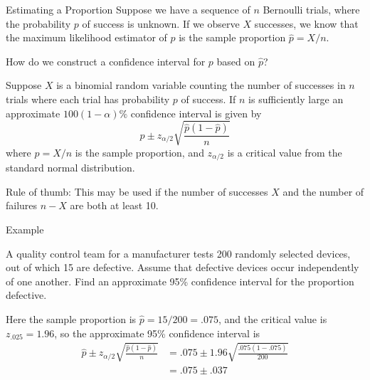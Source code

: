\documentclass[t,handout]{beamer}
\begin{document}
    
    \begin{frame}{Estimating a Proportion}
    Suppose we have a sequence of $n$ Bernoulli trials, where the probability $p$ of success is unknown. If we observe $X$ successes, we know that the maximum likelihood estimator of $p$ is the sample proportion $\hat p=X/n$. 
    
    \vspace{.2cm}\pause How do we construct a confidence interval for $p$ based on $\hat p$?
    \pause \begin{block}{}Suppose $X$ is a binomial random variable counting the number of successes in $n$ trials where each trial has probability $p$ of success. If $n$ is sufficiently large an approximate $100(1-\alpha)\%$ confidence interval is given by
    $$\hat p \pm z_{\alpha/2}\sqrt{\frac{\hat p(1-\hat p)}n}$$
    where $\hat p=X/n$ is the sample proportion, and $z_{\alpha/2}$ is a critical value from the standard normal distribution.
    \end{block}
    \pause Rule of thumb: This may be used if the number of successes $X$ and the number of failures $n-X$ are both at least 10.
    \end{frame}
    
    \begin{frame}{Example}
    \begin{block}{}
    A quality control team for a manufacturer tests 200 randomly selected devices, out of which 15 are defective. Assume that defective devices occur independently of one another. Find an approximate 95\% confidence interval for the proportion defective.
    \end{block}
    \pause Here the sample proportion is $\hat p=15/200=.075$, and the critical value is $z_{.025}=1.96$, so the approximate 95\% confidence interval is
    \begin{align*}
    \hat p \pm z_{\alpha/2}\sqrt{\frac{\hat p(1-\hat p)}n} &= .075 \pm 1.96\sqrt{\frac{.075(1-.075)}{200}} \\
    &= .075 \pm .037
    \end{align*}
    \end{frame}
    
\end{document}
